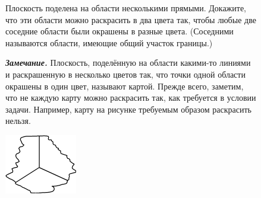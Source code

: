 \begin{figure}[h]
\begin{minipage}{0.79\linewidth}\setlength{\parindent}{1.5em}
\begin{thm}
Плоскость поделена на области несколькими прямыми. Докажите, что эти области можно раскрасить в два цвета так, чтобы любые две соседние области были окрашены в разные цвета. (Соседними называются области, имеющие общий участок границы.)
\end{thm}
\par
\textbf{\textit{Замечание.}} Плоскость, поделённую на области какими-то линиями и раскрашенную в несколько цветов так, что точки одной области окрашены в один цвет, называют картой. Прежде всего, заметим, что не каждую карту можно раскрасить так, как требуется в условии задачи. Например, карту на рисунке требуемым образом раскрасить нельзя.
\end{minipage}
\hfill
\begin{minipage}{0.15\linewidth}
    \includegraphics[width=0.95\columnwidth]{img/karta.png}
\end{minipage}
\end{figure}

\par

